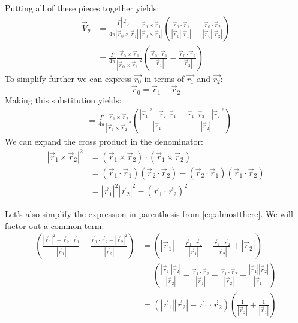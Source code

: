 \documentclass{article}
\begin{document}
Putting all of these pieces together yields:
\begin{align}
    \vec{V}_\theta &= \frac{\Gamma |\vec{r}_0|}{4 \pi |\vec{r}_0 \times \vec{r}_1 |} \frac{\vec{r}_0 \times \vec{r}_1}{|\vec{r}_0 \times \vec{r}_1|} \left(\frac{\vec{r}_0 \cdot \vec{r}_1}{|\vec{r}_0||\vec{r}_1|} - \frac{\vec{r}_0 \cdot \vec{r}_2}{|\vec{r}_0||\vec{r}_2|} \right)\\
    &= \frac{\Gamma}{4 \pi} \frac{\vec{r}_0 \times \vec{r}_1}{|\vec{r}_0 \times \vec{r}_1|^2} \left(\frac{\vec{r}_0 \cdot \vec{r}_1}{|\vec{r}_1|} - \frac{\vec{r}_0 \cdot \vec{r}_2}{|\vec{r}_2|} \right)
\end{align}
To simplify further we can express $\vec{r_0}$ in terms of $\vec{r_1}$ and $\vec{r_2}$:
\begin{equation}
    \vec{r}_0 = \vec{r}_1 - \vec{r}_2
\end{equation}
Making this substitution yields:
\begin{align}
    &= \frac{\Gamma}{4 \pi} \frac{\vec{r}_1 \times \vec{r}_2}{|\vec{r}_1 \times \vec{r}_2|^2} \left(\frac{|\vec{r}_1|^2 - \vec{r}_2 \cdot \vec{r}_1}{|\vec{r}_1|} - \frac{\vec{r}_1 \cdot \vec{r}_2 - |\vec{r}_2|^2}{|\vec{r}_2|} \right)
    \label{eq:almostthere}
\end{align}
We can expand the cross product in the denominator:
\begin{align}
|\vec{r}_1 \times \vec{r}_2|^2 &= (\vec{r}_1 \times \vec{r}_2) \cdot (\vec{r}_1 \times \vec{r}_2)\\
&= (\vec{r}_1 \cdot \vec{r}_1)(\vec{r}_2 \cdot \vec{r}_2) - (\vec{r}_2 \cdot \vec{r}_1)(\vec{r}_1 \cdot \vec{r}_2)\\
&= |\vec{r}_1|^2|\vec{r}_2|^2 - (\vec{r}_1 \cdot \vec{r}_2)^2
\label{eq:sub1}
\end{align}


Let's also simplify the expression in parenthesis  from \cref{eq:almostthere}.  We will factor out a common term:
\begin{align}
\left(\frac{|\vec{r}_1|^2 - \vec{r}_2 \cdot \vec{r}_1}{|\vec{r}_1|} - \frac{\vec{r}_1 \cdot \vec{r}_2 - |\vec{r}_2|^2}{|\vec{r}_2|} \right) &= 
\left(|\vec{r}_1| - \frac{\vec{r}_1 \cdot \vec{r}_2}{|\vec{r}_1|} - \frac{\vec{r}_1 \cdot \vec{r}_2}{|\vec{r}_2|} +  |\vec{r}_2| \right) \\ 
&=
\left(\frac{|\vec{r}_1||\vec{r}_2|}{|\vec{r}_2|} - \frac{\vec{r}_1 \cdot \vec{r}_2}{|\vec{r}_1|} - \frac{\vec{r}_1 \cdot \vec{r}_2}{|\vec{r}_2|} +  \frac{|\vec{r}_1||\vec{r}_2|}{|\vec{r}_1|} \right) \\ 
&=
(|\vec{r}_1||\vec{r}_2| - \vec{r}_1 \cdot \vec{r}_2 )\left(\frac{1}{|\vec{r}_2|} + \frac{1}{|\vec{r}_1|} \right)
\label{eq:sub2}
\end{align}
\end{document}
